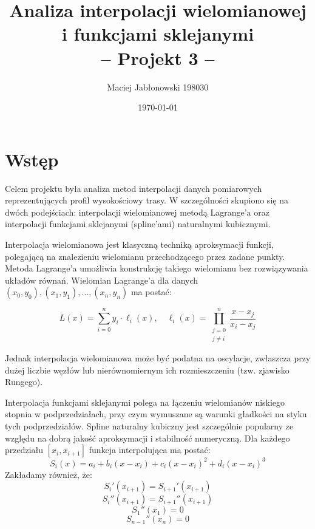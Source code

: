 \documentclass[a4paper,12pt]{article}
\title{Analiza interpolacji wielomianowej i funkcjami sklejanymi \\ -- Projekt 3 --}
\author{Maciej Jabłonowski 198030}
\date{\today}
\begin{document}
\maketitle


\section{Wstęp}

Celem projektu była analiza metod interpolacji danych pomiarowych reprezentujących profil wysokościowy trasy. W szczególności skupiono się na dwóch podejściach: interpolacji wielomianowej metodą Lagrange’a oraz interpolacji funkcjami sklejanymi (spline’ami) naturalnymi kubicznymi.

Interpolacja wielomianowa jest klasyczną techniką aproksymacji funkcji, polegającą na znalezieniu wielomianu przechodzącego przez zadane punkty. Metoda Lagrange’a umożliwia konstrukcję takiego wielomianu bez rozwiązywania układów równań. Wielomian Lagrange’a dla danych \\ $(x_0, y_0), (x_1, y_1), \dots, (x_n, y_n)$ ma postać:

\begin{equation}
L(x) = \sum_{i=0}^{n} y_i \cdot \ell_i(x), \quad
\ell_i(x) = \prod_{\substack{j=0 \\ j \ne i}}^{n} \frac{x - x_j}{x_i - x_j}
\end{equation}

Jednak interpolacja wielomianowa może być podatna na oscylacje, zwłaszcza przy dużej liczbie węzłów lub nierównomiernym ich rozmieszczeniu (tzw. zjawisko Rungego).

Interpolacja funkcjami sklejanymi polega na łączeniu wielomianów niskiego stopnia w podprzedziałach, przy czym wymuszane są warunki gładkości na styku tych podprzedziałów. Spline naturalny kubiczny jest szczególnie popularny ze względu na dobrą jakość aproksymacji i stabilność numeryczną. Dla każdego przedziału $[x_i, x_{i+1}]$ funkcja interpolująca ma postać:
\begin{equation}
S_i(x) = a_i + b_i(x - x_i) + c_i(x - x_i)^2 + d_i(x - x_i)^3
\end{equation}
Zakładamy również, że:
\begin{equation}
S_i'(x_{i+1}) = S_{i+1}'(x_{i+1})
\end{equation}
\begin{equation}
S_i''(x_{i+1}) = S_{i+1}''(x_{i+1})
\end{equation}
\begin{equation}
S_1''(x_1) = 0
\end{equation}
\begin{equation}
S_{n-1}''(x_n) = 0
\end{equation}
\end{document}
